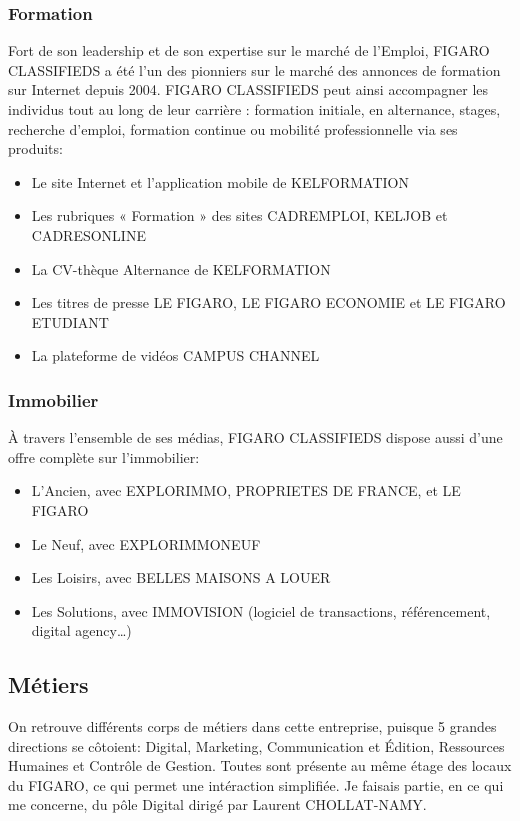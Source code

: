 \subsubsection{Formation}
Fort de son leadership et de son expertise sur le marché de l'Emploi, FIGARO CLASSIFIEDS a été l'un des pionniers sur le marché des annonces de formation sur Internet depuis 2004.
FIGARO CLASSIFIEDS peut ainsi accompagner les individus tout au long de leur carrière : formation initiale, en alternance, stages, recherche d'emploi, formation continue ou mobilité professionnelle via ses produits:
\begin{itemize}
  \item Le site Internet et l'application mobile de KELFORMATION
  \item Les rubriques « Formation » des sites CADREMPLOI, KELJOB et CADRESONLINE
  \item La CV-thèque Alternance de KELFORMATION
  \item Les titres de presse LE FIGARO, LE FIGARO ECONOMIE et LE FIGARO ETUDIANT
  \item La plateforme de vidéos CAMPUS CHANNEL
\end{itemize}
\subsubsection{Immobilier}
À travers l'ensemble de ses médias, FIGARO CLASSIFIEDS dispose aussi d’une offre complète sur l’immobilier:
\begin{itemize}
  \item L’Ancien, avec EXPLORIMMO, PROPRIETES DE FRANCE, et LE FIGARO
  \item Le Neuf, avec EXPLORIMMONEUF
  \item Les Loisirs, avec BELLES MAISONS A LOUER
  \item Les Solutions, avec IMMOVISION (logiciel de transactions, référencement, digital agency…)
\end{itemize}

\subsection{Métiers}
On retrouve différents corps de métiers dans cette entreprise, puisque 5 grandes directions se côtoient:  Digital, Marketing, Communication et Édition, Ressources Humaines et Contrôle de Gestion.
Toutes sont présente au même étage des locaux du FIGARO, ce qui permet une intéraction simplifiée.
Je faisais partie, en ce qui me concerne, du pôle Digital dirigé par Laurent CHOLLAT-NAMY.

